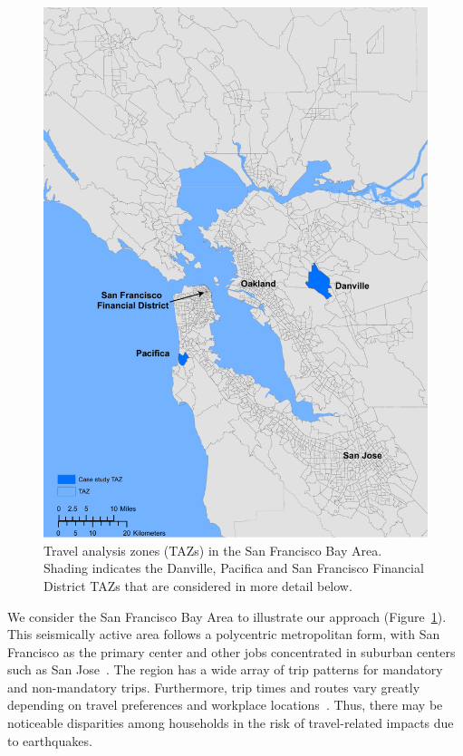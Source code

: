 \begin{figure}
\centering
\includegraphics[width=4.5in]{FIGS/equity_case.pdf} 
\caption{Travel analysis zones (TAZs) in the San Francisco Bay Area. Shading indicates the Danville, Pacifica and San Francisco Financial District TAZs that are considered in more detail below. }
\label{fig:equity_study_area}
\end{figure}


We consider the San Francisco Bay Area to illustrate our approach (Figure~\ref{fig:equity_study_area}). This seismically active area follows a polycentric metropolitan form, with San Francisco as the primary center and other jobs concentrated in suburban centers such as San Jose~\cite{cervero_polycentrism_1997}. The region has a wide array of trip patterns for mandatory and non-mandatory trips. Furthermore, trip times and routes vary greatly depending on travel preferences and workplace locations~\cite{cervero_polycentrism_1997}. Thus,  there may be noticeable disparities among households in the risk of travel-related impacts due to earthquakes. 

